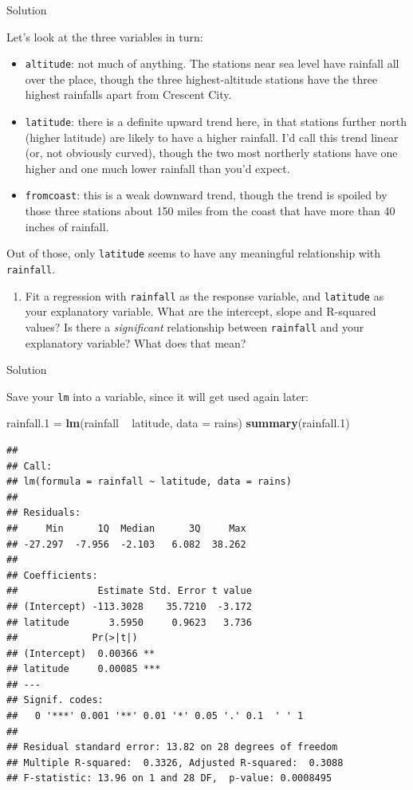 \documentclass[]{tufte-book}
\newenvironment{Shaded}{}{}
\newcommand{\DataTypeTok}[1]{\textcolor[rgb]{0.56,0.13,0.00}{#1}}
\newcommand{\FloatTok}[1]{\textcolor[rgb]{0.25,0.63,0.44}{#1}}
\newcommand{\KeywordTok}[1]{\textcolor[rgb]{0.00,0.44,0.13}{\textbf{#1}}}
\newcommand{\NormalTok}[1]{#1}
\newcommand{\OperatorTok}[1]{\textcolor[rgb]{0.40,0.40,0.40}{#1}}
\newcommand{\StringTok}[1]{\textcolor[rgb]{0.25,0.44,0.63}{#1}}
\providecommand{\tightlist}{%
  \setlength{\itemsep}{0pt}\setlength{\parskip}{0pt}}
\theoremstyle{definition}
\theoremstyle{definition}
\theoremstyle{definition}
\theoremstyle{remark}
\begin{document}
Solution

Let's look at the three variables in turn:

\begin{itemize}
\item
  \texttt{altitude}: not much of anything. The stations near sea level
  have rainfall all over the place, though the three highest-altitude
  stations have the three highest rainfalls apart from Crescent City.
\item
  \texttt{latitude}: there is a definite upward trend here, in that
  stations further north (higher latitude) are likely to have a higher
  rainfall. I'd call this trend linear (or, not obviously curved),
  though the two most northerly stations have one higher and one much
  lower rainfall than you'd expect.
\item
  \texttt{fromcoast}: this is a weak downward trend, though the trend is
  spoiled by those three stations about 150 miles from the coast that
  have more than 40 inches of rainfall.
\end{itemize}

Out of those, only \texttt{latitude} seems to have any meaningful
relationship with \texttt{rainfall}.

\begin{enumerate}
\def\labelenumi{(\alph{enumi})}
\setcounter{enumi}{4}
\tightlist
\item
  Fit a regression with \texttt{rainfall} as the response variable, and
  \texttt{latitude} as your explanatory variable. What are the
  intercept, slope and R-squared values? Is there a \emph{significant}
  relationship between \texttt{rainfall} and your explanatory variable?
  What does that mean?
\end{enumerate}

Solution

Save your \texttt{lm} into a variable, since it will get used again
later:

\begin{Shaded}
\begin{Highlighting}[]
\NormalTok{rainfall}\FloatTok{.1}\NormalTok{ =}\StringTok{ }\KeywordTok{lm}\NormalTok{(rainfall }\OperatorTok{~}\StringTok{ }\NormalTok{latitude, }\DataTypeTok{data =}\NormalTok{ rains)}
\KeywordTok{summary}\NormalTok{(rainfall}\FloatTok{.1}\NormalTok{)}
\end{Highlighting}
\end{Shaded}

\begin{verbatim}
## 
## Call:
## lm(formula = rainfall ~ latitude, data = rains)
## 
## Residuals:
##     Min      1Q  Median      3Q     Max 
## -27.297  -7.956  -2.103   6.082  38.262 
## 
## Coefficients:
##              Estimate Std. Error t value
## (Intercept) -113.3028    35.7210  -3.172
## latitude       3.5950     0.9623   3.736
##             Pr(>|t|)    
## (Intercept)  0.00366 ** 
## latitude     0.00085 ***
## ---
## Signif. codes:  
##   0 '***' 0.001 '**' 0.01 '*' 0.05 '.' 0.1  ' ' 1
## 
## Residual standard error: 13.82 on 28 degrees of freedom
## Multiple R-squared:  0.3326, Adjusted R-squared:  0.3088 
## F-statistic: 13.96 on 1 and 28 DF,  p-value: 0.0008495
\end{verbatim}
\end{document}
